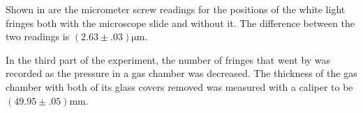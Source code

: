\begin{paper}
	Shown in \figWLF are the micrometer screw readings for the positions of the white light fringes both with the microscope slide and without it.
	The difference between the two readings is $(2.63\pm.03)\si{\micro\meter}$.
	
	In the third part of the experiment, the number of fringes that went by was recorded as the pressure in a gas chamber was decreased. The thickness of the gas chamber with both of its glass covers removed was measured with a caliper to be $(49.95\pm.05)\si{\milli\meter}$.
	
\end{paper}
